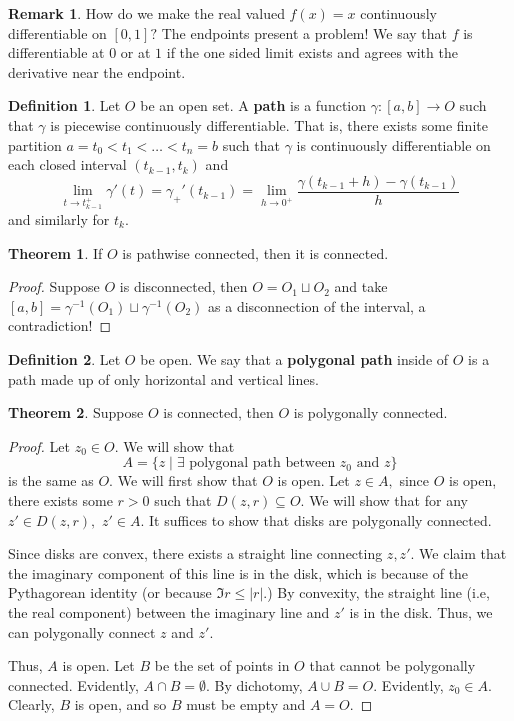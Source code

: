 \documentclass[10pt, oneside]{article}
\theoremstyle{definition}
\newtheorem{thm}{Theorem}
\newtheorem{defn}{Definition}
\newtheorem{rem}{Remark}
\begin{document}
\begin{rem}
    How do we make the real valued $f(x) = x$ continuously differentiable on $[0,1]?$ The endpoints present a problem! We say that $f$ is differentiable at $0$ or at $1$ if the one sided limit exists and agrees with the derivative near the endpoint.
\end{rem}

\begin{defn}
    Let $O$ be an open set. A \textbf{path} is a function $\gamma: [a,b] \to O$ such that $\gamma$ is piecewise continuously differentiable. That is, there exists some finite partition $a = t_0 < t_1 < \dots < t_n = b$ such that $\gamma$ is continuously differentiable on each closed interval $(t_{k-1}, t_k)$ and 
    \[\lim_{t \to t_{k-1}^+} \gamma'(t) = \gamma_+'(t_{k-1}) = \lim_{h\to 0^+} \frac{\gamma(t_{k-1} +h) - \gamma(t_{k-1})}{h}\] and similarly for $t_k.$
\end{defn}

\begin{thm}
    If $O$ is pathwise connected, then it is connected.
\end{thm}
\begin{proof}
    Suppose $O$ is disconnected, then $O = O_1 \sqcup O_2$ and take $[a,b] = \gamma^{-1}(O_1) \sqcup \gamma^{-1}(O_2)$ as a disconnection of the interval, a contradiction!
\end{proof}

\begin{defn}
    Let $O$ be open. We say that a \textbf{polygonal path} inside  of $O$ is a path made up of only horizontal and vertical lines. 
\end{defn}

\begin{thm}
    Suppose $O$ is connected, then $O$ is polygonally connected. 
\end{thm}
\begin{proof}
    Let $z_0 \in O.$ We will show that 
    \[A = \{z \;  | \; \exists \text{ polygonal path between $z_0$ and $z$} \}\] is the same as $O.$ We will first show that $O$ is open. Let $z\in A,$ since $O$ is open, there exists some $r>0$ such that $D(z, r) \subseteq O.$ We will show that for any $z' \in D(z,r),$ $z' \in A.$ It suffices to show that disks are polygonally connected. 

    Since disks are convex, there exists a straight line connecting $z, z'.$ We claim that the imaginary component of this line is in the disk, which is because of the Pythagorean identity (or because $\Im{r} \leq |r|.$) By convexity, the straight line (i.e, the real component) between the imaginary line and $z'$ is in the disk. Thus, we can polygonally connect $z$ and $z'.$

    Thus, $A$ is open. Let $B$ be the set of points in $O$ that cannot be polygonally connected. Evidently, $A \cap B = \emptyset.$ By dichotomy, $A \cup B = O.$ Evidently, $z_0 \in A.$ Clearly, $B$ is open, and so $B$ must be empty and $A = O.$
\end{proof}
\end{document}
